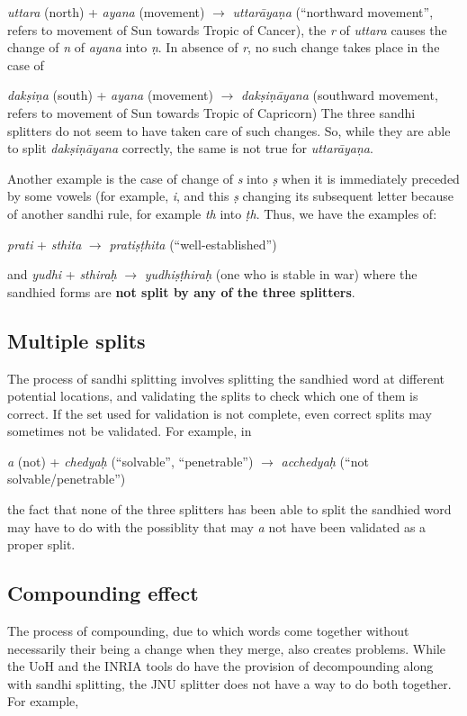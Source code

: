 \documentclass[11pt]{article}
\begin{document}
       \textit{uttara} (north) + \textit{ayana} (movement) $\rightarrow$ \textit{uttar\={a}ya\d{n}a} (``northward movement'', refers to movement of Sun towards Tropic of Cancer), the \textit{r} of \textit{uttara} causes the change of \textit{n} of \textit{ayana} into \textit{ \d{n}}. In absence of \textit{r}, no such change takes place in the case of 


\textit{dak\d{s}i\d{n}a} (south) + \textit{ayana} (movement) $\rightarrow$ \textit{dak\d{s}i\d{n}\={a}yana} (southward movement, refers to movement of Sun towards Tropic of Capricorn) 
The three sandhi splitters do not seem to have taken care of such changes. So, while they are able to split \textit{dak\d{s}i\d{n}\={a}yana} correctly, the same is not true for \textit{uttar\={a}ya\d{n}a}.

 Another example is the case of change of \textit{s} into \textit{\d{s}} when it is immediately preceded by some vowels (for example, \textit{i}, and this \textit{\d{s}} changing its subsequent letter because of another sandhi rule, for example  \textit{th} into \textit{\d{t}h}. Thus, we have the examples of:
 
                    \textit{prati} + \textit{sthita} $\rightarrow$ \textit{prati\d{s}\d{t}hita} (``well-established'')
                     
                     
and   \textit{yudhi} + \textit{sthira\d{h}} $\rightarrow$ \textit{yudhi\d{s}\d{t}hira\d{h}}  (one who is stable in war)
where the sandhied forms are \textbf{not split by any of the three splitters}.


\subsection{Multiple splits} 
The process of sandhi splitting involves splitting the sandhied word at different potential locations, and validating the splits to check which one of them is correct. If the set used for validation is not complete, even correct splits may sometimes not be validated. For example, in 

   \textit{a} (not) + \textit{chedya\d{h}} (``solvable'', ``penetrable'') $\rightarrow$ \textit{acchedya\d{h}} (``not solvable/penetrable'')
   
the fact that none of the three splitters has been able to split the sandhied word may have to do with the possiblity that may \textit{a} not have been validated as a proper split.


\subsection{Compounding effect}
The process of compounding, due to which words come together without necessarily their being a change when they merge, also creates problems. While the UoH and the INRIA tools do have the provision of decompounding along with sandhi splitting, the JNU splitter does not have a way to do both together.
For example,
\end{document}
